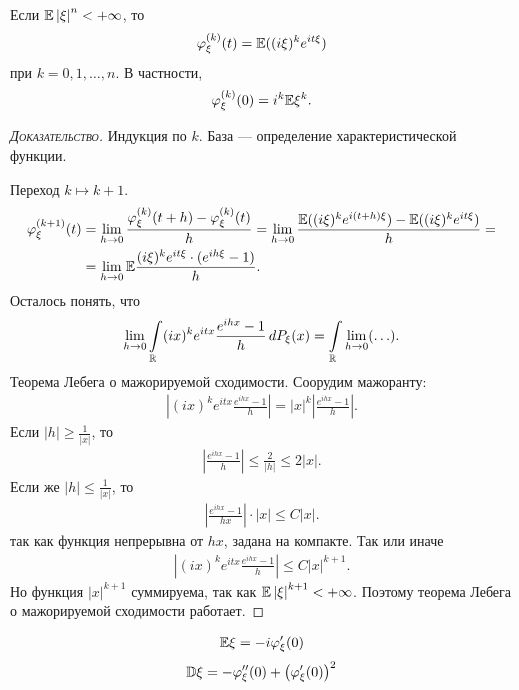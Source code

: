\documentclass[../main.tex]{subfiles}
\begin{document}
\begin{thm}
 Если $ \mathbb E \left| \xi \right|^{n} < +\infty $, то
 \begin{align*}
  \varphi_\xi^{(k)}(t) = \mathbb E((i\xi)^{k}e^{it\xi})
 \end{align*} при $ k = 0, 1, \ldots, n $. В частности,
 \begin{align*}
  \varphi_\xi^{(k)}(0) = i^{k} \mathbb E\xi^{k}.
 \end{align*}
\end{thm}
\begin{proof}[\normalfont\textsc{Доказательство}]
 Индукция по $ k $. База --- определение характеристической функции.

 Переход $ k \mapsto k + 1 $.
 \begin{align*}
  \varphi_\xi^{(k+1)}(t) &= \lim_{h \to 0} \frac{\varphi_\xi^{(k)}(t+h) - \varphi_\xi^{(k)}(t)}{h} = \lim_{h \to 0} \frac{\mathbb E((i\xi)^{k}e^{i(t+h)\xi}) - \mathbb E((i\xi)^{k}e^{it\xi})}{h} = \\
  &= \lim_{h \to 0} \mathbb E \frac{(i\xi)^{k}e^{it\xi} \cdot (e^{ih\xi} - 1)}{h}.
 \end{align*} Осталось понять, что
 \begin{align*}
  \lim_{h \to 0} \int\limits_{\mathbb{R}} (ix)^{k}e^{itx} \frac{e^{ihx} - 1}{h}\,dP_\xi(x) = \int\limits_{\mathbb{R}} \lim_{h \to 0} (\ldots).
 \end{align*} Теорема Лебега о мажорируемой сходимости. Соорудим мажоранту:
 \begin{align*}
  \left| (ix)^{k}e^{itx}\frac{e^{ihx}-1}{h} \right| = \left| x \right|^{k} \left| \frac{e^{ihx}-1}{h} \right|.
 \end{align*} Если $ \left| h \right| \geqslant \frac{1}{\left| x \right|} $, то
 \begin{align*}
  \left| \frac{e^{ihx}-1}{h} \right| \leqslant \frac{2}{\left| h \right|} \leqslant 2 \left| x \right|.
 \end{align*} Если же $ \left| h \right| \leqslant \frac{1}{\left| x \right|} $, то
 \begin{align*}
  \left| \frac{e^{ihx}-1}{hx} \right| \cdot \left| x \right| \leqslant C \left| x \right|.
 \end{align*} так как функция непрерывна от $ hx $, задана на компакте. Так или иначе
 \begin{align*}
  \left| (ix)^{k}e^{itx}\frac{e^{ihx}-1}{h} \right| \leqslant C \left| x \right|^{k+1}. 
 \end{align*} Но функция $ \left| x \right|^{k+1} $ суммируема, так как $ \mathbb E \left| \xi \right|^{k+1}  < +\infty$. Поэтому теорема Лебега о мажорируемой сходимости работает.
\end{proof}
\begin{crly}
 \begin{align*}
  \mathbb E\xi = -i \varphi'_\xi(0)
 \end{align*}
 \begin{align*}
  \mathbb D\xi = -\varphi''_\xi(0) + \left( \varphi'_\xi(0) \right)^{2}
 \end{align*}
\end{crly}
\end{document}
